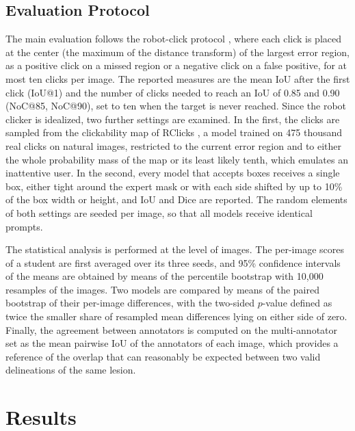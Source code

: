 \documentclass[runningheads]{llncs}
\newcommand{\gentable}[1]{\IfFileExists{generated/#1.tex}{}%
  {\begin{table}[t]\centering\fbox{\textcolor{red}{generated/#1.tex: run tools/paper\_outputs.sh}}\end{table}}}
\begin{document}
\subsection{Evaluation Protocol}

The main evaluation follows the robot-click protocol \cite{xu2016dios}, where each click is placed at the center (the maximum of the distance transform) of the largest error region, as a positive click on a missed region or a negative click on a false positive, for at most ten clicks per image. The reported measures are the mean IoU after the first click (IoU@1) and the number of clicks needed to reach an IoU of 0.85 and 0.90 (NoC@85, NoC@90), set to ten when the target is never reached. Since the robot clicker is idealized, two further settings are examined. In the first, the clicks are sampled from the clickability map of RClicks \cite{antonov2024rclicks}, a model trained on 475 thousand real clicks on natural images, restricted to the current error region and to either the whole probability mass of the map or its least likely tenth, which emulates an inattentive user. In the second, every model that accepts boxes receives a single box, either tight around the expert mask or with each side shifted by up to 10\% of the box width or height, and IoU and Dice are reported. The random elements of both settings are seeded per image, so that all models receive identical prompts.

The statistical analysis is performed at the level of images. The per-image scores of a student are first averaged over its three seeds, and 95\% confidence intervals of the means are obtained by means of the percentile bootstrap \cite{efron1993bootstrap} with 10{,}000 resamples of the images. Two models are compared by means of the paired bootstrap of their per-image differences, with the two-sided $p$-value defined as twice the smaller share of resampled mean differences lying on either side of zero. Finally, the agreement between annotators is computed on the multi-annotator set as the mean pairwise IoU of the annotators of each image, which provides a reference of the overlap that can reasonably be expected between two valid delineations of the same lesion.

\section{Results}\label{sec:results}

\gentable{click}
\gentable{click_cmp}
\end{document}
